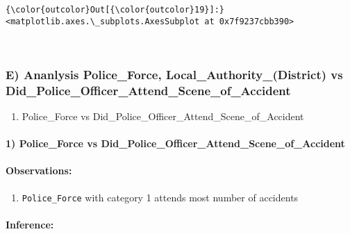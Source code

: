 \documentclass[11pt]{article}
\begin{document}
\begin{Verbatim}[commandchars=\\\{\}]
{\color{outcolor}Out[{\color{outcolor}19}]:} <matplotlib.axes.\_subplots.AxesSubplot at 0x7f9237cbb390>
\end{Verbatim}
            
    \begin{center}
    \end{center}
    { \hspace*{\fill} \\}
    
    \subsubsection{E) Ananlysis Police\_Force, Local\_Authority\_(District)
vs
Did\_Police\_Officer\_Attend\_Scene\_of\_Accident}\label{e-ananlysis-policeux5fforce-localux5fauthorityux5fdistrict-vs-didux5fpoliceux5fofficerux5fattendux5fsceneux5fofux5faccident}

\begin{enumerate}
\def\labelenumi{\arabic{enumi})}
\itemsep1pt\parskip0pt
\item
  Police\_Force vs Did\_Police\_Officer\_Attend\_Scene\_of\_Accident
\end{enumerate}

    \paragraph{1) Police\_Force vs
Did\_Police\_Officer\_Attend\_Scene\_of\_Accident}\label{policeux5fforce-vs-didux5fpoliceux5fofficerux5fattendux5fsceneux5fofux5faccident}

\paragraph{Observations:}\label{observations}

\begin{enumerate}
\def\labelenumi{\arabic{enumi})}
\itemsep1pt\parskip0pt
\item
  \texttt{Police\_Force} with category 1 attends most number of
  accidents
\end{enumerate}

\paragraph{Inference:}\label{inference}
\end{document}
